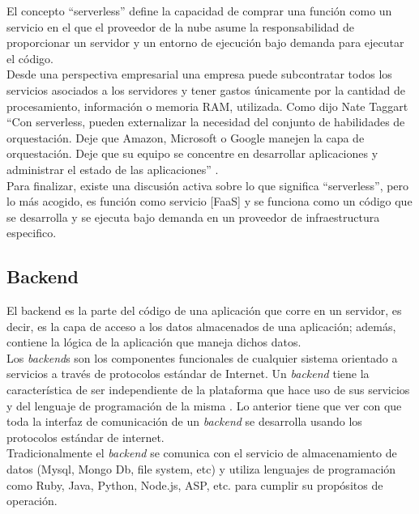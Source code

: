 El concepto “serverless” define la capacidad de comprar una función como un servicio en el que el proveedor de la nube asume la responsabilidad de proporcionar un servidor y un entorno de ejecución bajo demanda para ejecutar el código.
\vspace{0.5cm}\\
Desde una perspectiva empresarial una empresa puede subcontratar todos los servicios asociados a los servidores y tener gastos únicamente por la cantidad de procesamiento, información o memoria RAM, utilizada. Como dijo Nate Taggart ``Con serverless, pueden externalizar la necesidad del conjunto de habilidades de orquestación. Deje que Amazon, Microsoft o Google manejen la capa de orquestación. Deje que su equipo se concentre en desarrollar aplicaciones y administrar el estado de las aplicaciones'' \cite{Bhatia2018}.
\vspace{0.5cm}\\
Para finalizar, existe una discusión activa sobre lo que significa ``serverless'', pero lo más acogido, es función como servicio [FaaS] y se funciona como un código que se desarrolla y se ejecuta bajo demanda en un proveedor de infraestructura especifico.

\subsection{Backend}

El backend es la parte del código de una aplicación que corre en un servidor, es decir, es la capa de acceso a los datos almacenados de una aplicación; además, contiene la lógica de la aplicación que maneja dichos datos. 
\vspace{0.5cm}\\
Los \textit{backend}s son los componentes funcionales de cualquier sistema orientado a servicios a través de protocolos estándar de Internet. Un \textit{backend} tiene la característica de ser independiente de la plataforma que hace uso de sus servicios y del lenguaje de programación de la misma \cite{Amelung2011}. Lo anterior tiene que ver con que toda la interfaz de comunicación de un \textit{backend} se desarrolla usando los protocolos estándar de internet.
\vspace{0.5cm}\\
Tradicionalmente el \textit{backend} se comunica con el servicio de almacenamiento de datos (Mysql, Mongo Db, file system, etc) y utiliza lenguajes de programación como Ruby, Java, Python, Node.js, ASP, etc. para cumplir su propósitos de operación.

